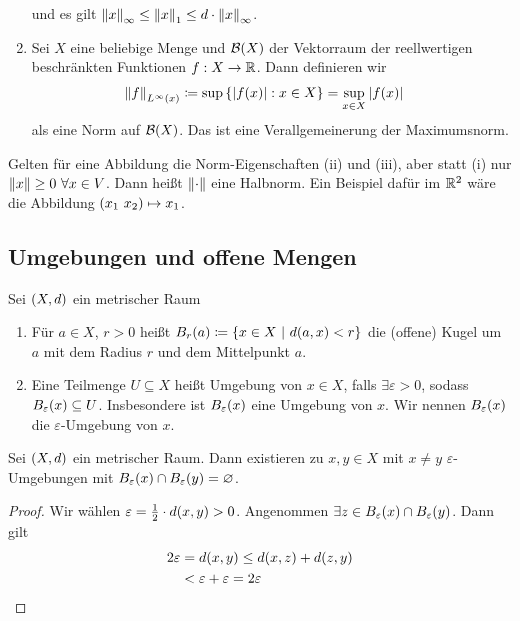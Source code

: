 \begin{beispiel}
\begin{enumerate}
        und es gilt $\left\lVert x\right\rVert_{\infty} \leq \left\lVert x\right\rVert_1 \leq d \cdot \left\lVert x\right\rVert_{\infty}$.
        \item Sei $X$ eine beliebige Menge und $\mathcal{B}\of{X}$ der Vektorraum der reellwertigen beschränkten Funktionen $f: X\rightarrow{} \mathbb{R}$. Dann definieren wir
        \begin{align*}
            \norm{f}_{L^{\infty}\of{x}} &\coloneqq \sup\set{\abs{f\of{x}}: x\in X} = \sup_{x\in X} \abs{f\of{x}}
        \end{align*}
        als eine Norm auf $\mathcal{B}\of{X}$. Das ist eine Verallgemeinerung der Maximumsnorm.
    \end{enumerate}
\end{beispiel}

\begin{bemerkung}[Halbnorm]
    Gelten für eine Abbildung die Norm-Eigenschaften (ii) und (iii), aber statt (i) nur $\left\lVert x\right\rVert \geq 0~\forall x\in V$. Dann heißt $\left\lVert\cdot\right\rVert$ eine Halbnorm. Ein Beispiel dafür im $\mathbb{R}^2$ wäre die Abbildung $\left(x_1~x_2\right)\mapsto x_1$.
\end{bemerkung}

\subsection{Umgebungen und offene Mengen}

\begin{definition}[Umgebung]
    Sei $\left(X, d\right)$ ein metrischer Raum
    \begin{enumerate}[label=(\alph*)]
        \item Für $a\in X$, $r > 0$ heißt $B_r\of{a} \coloneqq \set{x\in X ~\middle\vert~ d\of{a, x} < r}$ die (offene) Kugel um $a$ mit dem Radius $r$ und dem Mittelpunkt $a$.
        \item Eine Teilmenge $U\subseteq X$ heißt Umgebung von $x\in X$, falls $\exists\varepsilon > 0$, sodass $B_{\varepsilon}\of{x} \subseteq U$. Insbesondere ist $B_{\varepsilon}\of{x}$ eine Umgebung von $x$. Wir nennen $B_{\varepsilon}\of{x}$ die $\varepsilon$-Umgebung von $x$.
    \end{enumerate}
\end{definition}

\begin{satz}
    \label{satz:hausdorff-trennungsaxiom}
    Sei $\left(X, d\right)$ ein metrischer Raum. Dann existieren zu $x,y\in X$ mit $x\neq y$ $\varepsilon$-Umgebungen mit $B_{\varepsilon}\of{x} \cap B_{\varepsilon}\of{y} = \emptyset$.
    \begin{proof}
        Wir wählen $\varepsilon = \frac{1}{2}\cdot d\of{x,y} > 0$. Angenommen $\exists z\in B_{\varepsilon}\of{x} \cap B_{\varepsilon}\of{y}$. Dann gilt
        \begin{align*}
            2\varepsilon &= d\of{x,y} \leq d\of{x,z} + d\of{z,y}\\
            &< \varepsilon + \varepsilon = 2\varepsilon\qedhere
        \end{align*}
    \end{proof}
\end{satz}

